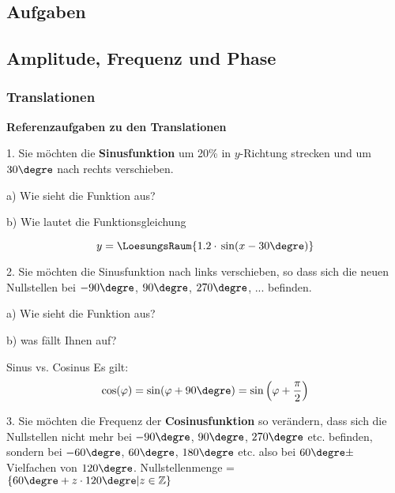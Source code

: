 \subsection*{Aufgaben}


\newpage


\subsection{Amplitude, Frequenz und Phase}

\subsubsection{Translationen}




\textbf{Referenzaufgaben zu den Translationen}

1. Sie möchten die \textbf{Sinusfunktion} um 20\% in $y$-Richtung strecken und um
$30\degre$ nach rechts verschieben.

a) Wie sieht die Funktion aus?

\renewcommand{\bbwFunctionColour}{gray!30}\noTRAINER{\trigsysDsin{}}
\renewcommand{\bbwFunctionColour}{blue}


b) Wie lautet die Funktionsgleichung

$$y = \LoesungsRaum{1.2 \cdot{} \sin(x - 30\degre)}$$
\newpage


2. Sie möchten die Sinusfunktion nach links verschieben, so dass sich die neuen Nullstellen bei
$-90\degre$, $90\degre$, $270\degre$, ... befinden.

a) Wie sieht die Funktion aus?

\noTRAINER{\renewcommand\bbwFunctionColour{gray!30}\trigsysDsin{}}
\TRAINER{\renewcommand\bbwFunctionColour{blue}\trigsysDcos{}}

b) was fällt Ihnen auf?

\begin{gesetz}{Sinus vs. Cosinus}{}
  Es gilt: $$\cos(\varphi)=\sin(\varphi+90\degre)=\sin\left(\varphi + \frac\pi2\right)$$
\end{gesetz}
\newpage

3. Sie möchten die Frequenz der \textbf{Cosinusfunktion} so verändern, dass sich die
Nullstellen nicht mehr bei $-90\degre$, $90\degre$, $270\degre$
etc. befinden, sondern bei $-60\degre$, $60\degre$, $180\degre$
etc. also bei $60\degre \pm$ Vielfachen von
$120\degre$. Nullstellenmenge = $\{60\degre+z\cdot{}120\degre|
z\in\mathbb{Z}\}$

